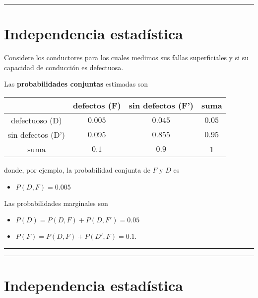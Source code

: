 \documentclass[
]{book}
\providecommand{\tightlist}{%
  \setlength{\itemsep}{0pt}\setlength{\parskip}{0pt}}
\begin{document}
\begin{center}\rule{0.5\linewidth}{0.5pt}\end{center}

\hypertarget{independencia-estaduxedstica-1}{%
\section{Independencia estadística}\label{independencia-estaduxedstica-1}}

Considere los conductores para los cuales medimos sus fallas superficiales y si su capacidad de conducción es defectuosa.

Las \textbf{probabilidades conjuntas} estimadas son

\begin{longtable}[]{@{}cccc@{}}
\toprule
& defectos (F) & sin defectos (F') & suma \\
\midrule
\endhead
defectuoso (D) & \(0.005\) & \(0.045\) & \(0.05\) \\
sin defectos (D') & \(0.095\) & \(0.855\) & \(0.95\) \\
suma & \(0.1\) & \(0.9\) & 1 \\
\bottomrule
\end{longtable}

donde, por ejemplo, la probabilidad conjunta de \(F\) y \(D\) es

\begin{itemize}
\tightlist
\item
  \(P(D,F)=0.005\)
\end{itemize}

Las probabilidades marginales son

\begin{itemize}
\tightlist
\item
  \(P(D)=P(D, F) + P(D, F')=0.05\)
\item
  \(P(F)=P(D, F) + P(D', F)= 0.1\).
\end{itemize}

\begin{center}\rule{0.5\linewidth}{0.5pt}\end{center}

\begin{center}\rule{0.5\linewidth}{0.5pt}\end{center}

\hypertarget{independencia-estaduxedstica-2}{%
\section{Independencia estadística}\label{independencia-estaduxedstica-2}}
\end{document}
